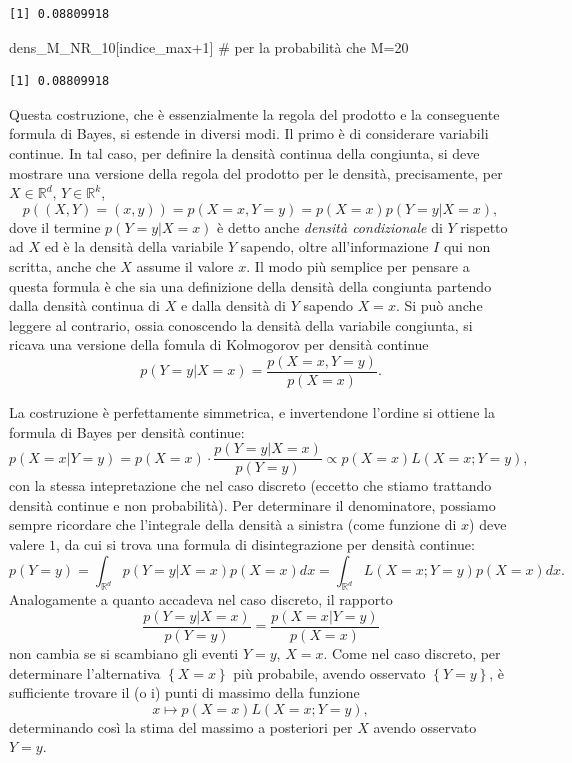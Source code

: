 \documentclass[
  italian,
  letterpaper,
]{book}
\newenvironment{Shaded}{\begin{snugshade}}{\end{snugshade}}
\newcommand{\CommentTok}[1]{\textcolor[rgb]{0.37,0.37,0.37}{#1}}
\newcommand{\DecValTok}[1]{\textcolor[rgb]{0.68,0.00,0.00}{#1}}
\newcommand{\NormalTok}[1]{\textcolor[rgb]{0.00,0.23,0.31}{#1}}
\newcommand{\SpecialCharTok}[1]{\textcolor[rgb]{0.37,0.37,0.37}{#1}}
\newcommand{\cur}[1]{\left\{ #1 \right\}}
\newcommand{\R}{\mathbb{R}}
\theoremstyle{definition}
\theoremstyle{remark}
\begin{document}
\begin{verbatim}
[1] 0.08809918
\end{verbatim}

\begin{Shaded}
\begin{Highlighting}[]
\NormalTok{dens\_M\_NR\_10[indice\_max}\SpecialCharTok{+}\DecValTok{1}\NormalTok{] }\CommentTok{\# per la probabilità che M=20}
\end{Highlighting}
\end{Shaded}

\begin{verbatim}
[1] 0.08809918
\end{verbatim}

Questa costruzione, che è essenzialmente la regola del prodotto e la
conseguente formula di Bayes, si estende in diversi modi. Il primo è di
considerare variabili continue. In tal caso, per definire la densità
continua della congiunta, si deve mostrare una versione della regola del
prodotto per le densità, precisamente, per \(X \in \R^d\),
\(Y \in \R^k\),
\[ p((X,Y)=(x,y) ) = p(X=x, Y=y) = p(X=x) p(Y=y | X=x),\] dove il
termine \(p(Y=y|X=x)\) è detto anche \emph{densità condizionale} di
\(Y\) rispetto ad \(X\) ed è la densità della variabile \(Y\) sapendo,
oltre all'informazione \(I\) qui non scritta, anche che \(X\) assume il
valore \(x\). Il modo più semplice per pensare a questa formula è che
sia una definizione della densità della congiunta partendo dalla densità
continua di \(X\) e dalla densità di \(Y\) sapendo \(X=x\). Si può anche
leggere al contrario, ossia conoscendo la densità della variabile
congiunta, si ricava una versione della fomula di Kolmogorov per densità
continue \[  p(Y =y | X=x) = \frac{ p(X=x, Y=y)}{p(X=x)}.\]

La costruzione è perfettamente simmetrica, e invertendone l'ordine si
ottiene la formula di Bayes per densità continue:
\[ p(X=x | Y =y ) = p(X=x) \cdot  \frac{ p(Y=y | X=x)}{p(Y=y)} \propto p(X=x) L(X=x; Y=y),\]
con la stessa intepretazione che nel caso discreto (eccetto che stiamo
trattando densità continue e non probabilità). Per determinare il
denominatore, possiamo sempre ricordare che l'integrale della densità a
sinistra (come funzione di \(x\)) deve valere \(1\), da cui si trova una
formula di disintegrazione per densità continue:
\[ p(Y=y) = \int_{\R^d}   p(Y=y | X=x) p(X=x)d x = \int_{\R^d} L(X=x; Y=y) p(X=x) dx.\]
Analogamente a quanto accadeva nel caso discreto, il rapporto
\[  \frac{ p(Y=y | X=x)}{p(Y=y)}  = \frac{ p(X=x | Y=y)}{p(X=x)} \] non
cambia se si scambiano gli eventi \(Y=y\), \(X=x\). Come nel caso
discreto, per determinare l'alternativa \(\cur{X=x}\) più probabile,
avendo osservato \(\cur{Y=y}\), è sufficiente trovare il (o i) punti di
massimo della funzione \[ x \mapsto  p(X=x) L(X=x; Y=y),\] determinando
così la stima del massimo a posteriori per \(X\) avendo osservato
\(Y=y\).
\end{document}
